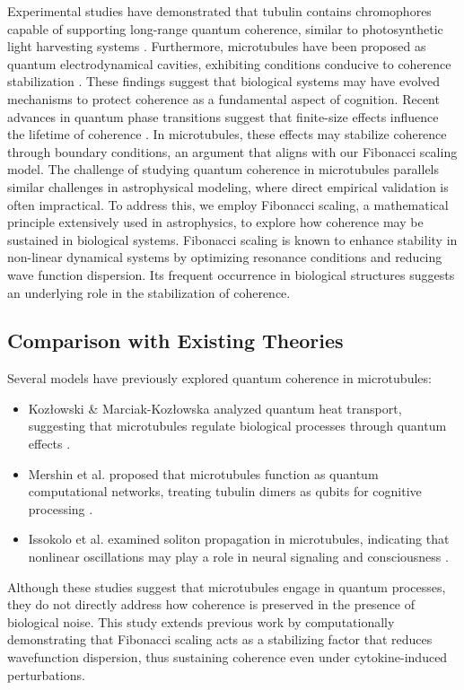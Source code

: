 \documentclass[entropy,article,submit,oneauthor,pdftex]{Definitions/mdpi}
\begin{document}
Experimental studies have demonstrated that tubulin contains chromophores capable of supporting long-range quantum coherence, similar to photosynthetic light harvesting systems \cite{craddock_feasibility_2014}. Furthermore, microtubules have been proposed as quantum electrodynamical cavities, exhibiting conditions conducive to coherence stabilization \cite{mavromatos_quantum_2011}. These findings suggest that biological systems may have evolved mechanisms to protect coherence as a fundamental aspect of cognition. Recent advances in quantum phase transitions suggest that finite-size effects influence the lifetime of coherence \cite{pelissetto_scaling_2023}. In microtubules, these effects may stabilize coherence through boundary conditions, an argument that aligns with our Fibonacci scaling model.
The challenge of studying quantum coherence in microtubules parallels similar challenges in astrophysical modeling, where direct empirical validation is often impractical. To address this, we employ Fibonacci scaling, a mathematical principle extensively used in astrophysics, to explore how coherence may be sustained in biological systems. Fibonacci scaling is known to enhance stability in non-linear dynamical systems by optimizing resonance conditions and reducing wave function dispersion. Its frequent occurrence in biological structures suggests an underlying role in the stabilization of coherence.

\subsection{Comparison with Existing Theories}
Several models have previously explored quantum coherence in microtubules:
\begin{itemize}
\item Kozłowski \& Marciak-Kozłowska analyzed quantum heat transport, suggesting that microtubules regulate biological processes through quantum effects \cite{kozlowski_wave-gtdiffusion_2005}.
\item Mershin et al. proposed that microtubules function as quantum computational networks, treating tubulin dimers as qubits for cognitive processing \cite{mershin_quantum_2000}.
\item Issokolo et al. examined soliton propagation in microtubules, indicating that nonlinear oscillations may play a role in neural signaling and consciousness \cite{issokolo_localized_2024}.
\end{itemize}

Although these studies suggest that microtubules engage in quantum processes, they do not directly address how coherence is preserved in the presence of biological noise. This study extends previous work by computationally demonstrating that Fibonacci scaling acts as a stabilizing factor that reduces wavefunction dispersion, thus sustaining coherence even under cytokine-induced perturbations.
\end{document}

